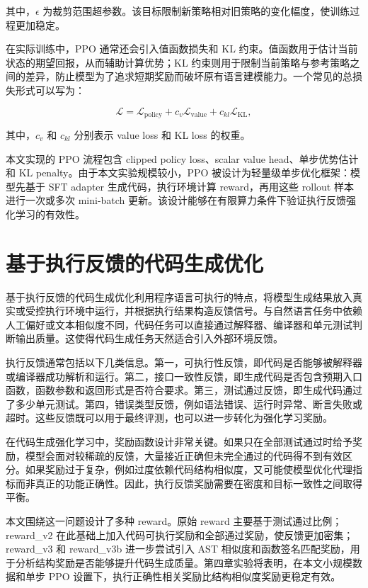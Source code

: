 其中，$\epsilon$ 为裁剪范围超参数。该目标限制新策略相对旧策略的变化幅度，使训练过程更加稳定。

在实际训练中，PPO 通常还会引入值函数损失和 KL 约束。值函数用于估计当前状态的期望回报，从而辅助计算优势；KL 约束则用于限制当前策略与参考策略之间的差异，防止模型为了追求短期奖励而破坏原有语言建模能力。一个常见的总损失形式可以写为：

\begin{equation}
  \mathcal{L}
  = \mathcal{L}_{\mathrm{policy}}
  + c_v\mathcal{L}_{\mathrm{value}}
  + c_{kl}\mathcal{L}_{\mathrm{KL}},
\end{equation}

其中，$c_v$ 和 $c_{kl}$ 分别表示 value loss 和 KL loss 的权重。

本文实现的 PPO 流程包含 clipped policy loss、scalar value head、单步优势估计和 KL penalty。由于本文实验规模较小，PPO 被设计为轻量级单步优化框架：模型先基于 SFT adapter 生成代码，执行环境计算 reward，再用这些 rollout 样本进行一次或多次 mini-batch 更新。该设计能够在有限算力条件下验证执行反馈强化学习的有效性。

\section{基于执行反馈的代码生成优化}

基于执行反馈的代码生成优化利用程序语言可执行的特点，将模型生成结果放入真实或受控执行环境中运行，并根据执行结果构造反馈信号。与自然语言任务中依赖人工偏好或文本相似度不同，代码任务可以直接通过解释器、编译器和单元测试判断输出质量。这使得代码生成任务天然适合引入外部环境反馈。

执行反馈通常包括以下几类信息。第一，可执行性反馈，即代码是否能够被解释器或编译器成功解析和运行。第二，接口一致性反馈，即生成代码是否包含预期入口函数，函数参数和返回形式是否符合要求。第三，测试通过反馈，即生成代码通过了多少单元测试。第四，错误类型反馈，例如语法错误、运行时异常、断言失败或超时。这些反馈既可以用于最终评测，也可以进一步转化为强化学习奖励。

在代码生成强化学习中，奖励函数设计非常关键。如果只在全部测试通过时给予奖励，模型会面对较稀疏的反馈，大量接近正确但未完全通过的代码得不到有效区分。如果奖励过于复杂，例如过度依赖代码结构相似度，又可能使模型优化代理指标而非真正的功能正确性。因此，执行反馈奖励需要在密度和目标一致性之间取得平衡。

本文围绕这一问题设计了多种 reward。原始 reward 主要基于测试通过比例；reward\_v2 在此基础上加入代码可执行奖励和全部通过奖励，使反馈更加密集；reward\_v3 和 reward\_v3b 进一步尝试引入 AST 相似度和函数签名匹配奖励，用于分析结构奖励是否能够提升代码生成质量。第四章实验将表明，在本文小规模数据和单步 PPO 设置下，执行正确性相关奖励比结构相似度奖励更稳定有效。


